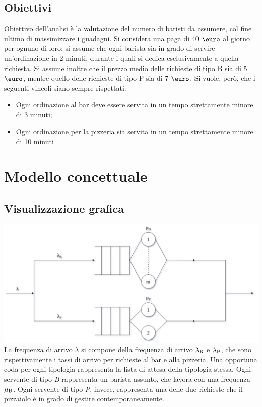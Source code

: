 \documentclass[a4paper, 12pt]{article}
\begin{document}
\bigskip

\subsection{Obiettivi}
Obiettivo dell'analisi è la valutazione del numero di baristi da
assumere, col fine 
ultimo di massimizzare i guadagni. Si considera una paga di
40 $\mbox{\euro}$ al giorno per ognuno di loro; si assume che ogni
barista sia in grado di servire un'ordinazione in 2 minuti, durante i quali si
dedica esclusivamente a quella richiesta. Si assume inoltre che il prezzo medio
delle richieste di tipo B sia di 5 $\mbox{\euro}$, mentre quello delle
richieste di tipo P sia di 7 $\mbox{\euro}$. Si vuole, però, che i seguenti 
vincoli siano sempre rispettati:
\begin{itemize}
  \item Ogni ordinazione al bar deve essere servita in un tempo strettamente
minore di 3 minuti;
  \item Ogni ordinazione per la pizzeria sia servita in un tempo strettamente
minore di 10 minuti 
\end{itemize}


\newpage
\section{Modello concettuale}
\subsection{Visualizzazione grafica}
	\includegraphics[width=\textwidth]{conceptual_model}
La frequenza di arrivo $\lambda$ si compone della frequenza di arrivo
$\lambda\textsubscript{B}$ e $\lambda\textsubscript{P}$, che sono rispettivamente i tassi di arrivo per richieste al bar e alla pizzeria. Una opportuna coda per ogni tipologia rappresenta la lista di attesa della tipologia stessa. Ogni servente di tipo \emph{B} rappresenta un barista assunto, che lavora con una frequenza $\mu\textsubscript{B}$. Ogni servente di tipo \emph{P}, invece, rappresenta una delle due richieste che il pizzaiolo è in grado di gestire contemporaneamente.
\end{document}
